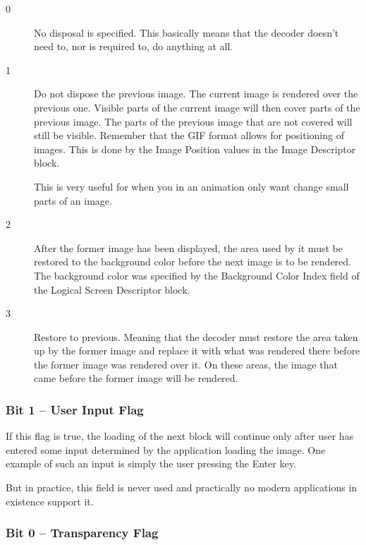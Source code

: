 \begin{description}

\item[0] No disposal is specified. This basically means that the
  decoder doesn't need to, nor is required to, do anything at all.

\item[1] Do not dispose the previous image. The current image is
  rendered over the previous one. Visible parts of the current image
  will then cover parts of the previous image. The parts of the
  previous image that are not covered will still be visible. Remember
  that the GIF format allows for positioning of images. This is done
  by the Image Position values in the Image Descriptor block.

  This is very useful for when you in an animation only want change
  small parts of an image.

\item[2] After the former image has been displayed, the area used by
  it must be restored to the background color before the next image is
  to be rendered. The background color was specified by the Background
  Color Index field of the Logical Screen Descriptor block.

\item[3] Restore to previous. Meaning that the decoder must restore
  the area taken up by the former image and replace it with what was
  rendered there before the former image was rendered over it. On
  these areas, the image that came before the former image will be
  rendered.


\end{description}

\subsubsection{Bit 1  -- User Input Flag}

If this flag is true, the loading of the next block will continue only
after user has entered some input determined by the application
loading the image. One example of such an input is simply the user
pressing the Enter key.

But in practice, this field is never used and practically no modern
applications in existence support it.

\subsubsection{Bit 0 -- Transparency Flag }

